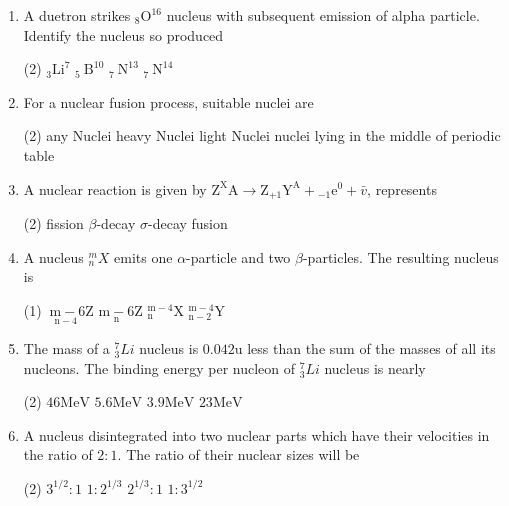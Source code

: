\begin{enumerate}
\begin{tasks}
\task[\textbf{C.}]The attractive part of the nuclear force has a long range
\task[\textbf{D.}]The nuclear force is charge dependent
\end{tasks}
		\item A duetron strikes ${ }_{8} \mathrm{O}^{16}$ nucleus with subsequent emission of alpha particle. Identify the nucleus so produced
	\begin{tasks}(2)
		\task[\textbf{A.}] ${ }_{3} \mathrm{Li}^{7}$
		\task[\textbf{B.}]  ${ }_{5} \mathrm{~B}^{10}$
		\task[\textbf{C.}]${ }_{7} \mathrm{~N}^{13}$
		\task[\textbf{D.}]${ }_{7} \mathrm{~N}^{14}$
	\end{tasks}
		\item For a nuclear fusion process, suitable nuclei are
	\begin{tasks}(2)
		\task[\textbf{A.}]any Nuclei 
		\task[\textbf{B.}] heavy Nuclei
		\task[\textbf{C.}]light Nuclei
		\task[\textbf{D.}]nuclei lying in the middle of periodic table
	\end{tasks}
		\item A nuclear reaction is given by $\mathrm{Z}^{\mathrm{X}}{\mathrm{A}} \rightarrow \mathrm{Z}_{+1} \mathrm{Y}^{\mathrm{A}}+{ }_{-1} \mathrm{e}^{0}+\bar{v}$, represents
	\begin{tasks}(2)
		\task[\textbf{A.}] fission
		\task[\textbf{B.}] $\beta$-decay
		\task[\textbf{C.}]$\sigma$-decay
		\task[\textbf{D.}]fusion
	\end{tasks}
	\item A nucleus ${ }_{n}^{m} X$ emits one $\alpha$-particle and two $\beta$-particles. The resulting nucleus is
\begin{tasks}(1)
	\task[\textbf{A.}] $\underset{\mathrm{n}-4}{\mathrm{~m}-6} \mathrm{Z}$
	\task[\textbf{B.}] $\underset{\mathrm{n}}{\mathrm{m}-6} \mathrm{Z}$
	\task[\textbf{C.}]${ }_{\mathrm{n}}^{\mathrm{m}-4} \mathrm{X}$
	\task[\textbf{D.}]${ }_{\mathrm{n}-2}^{\mathrm{m}-4} \mathrm{Y}$
\end{tasks}
	\item The mass of a ${ }_{3}^{7} L i$ nucleus is $0.042 \mathrm{u}$ less than the sum of the masses of all its nucleons. The binding energy per nucleon of ${ }_{3}^{7} L i$ nucleus is nearly
\begin{tasks}(2)
	\task[\textbf{A.}]$46 \mathrm{MeV}$
	\task[\textbf{B.}] $5.6 \mathrm{MeV}$
	\task[\textbf{C.}]$3.9 \mathrm{MeV}$
	\task[\textbf{D.}]$23 \mathrm{MeV}$ 
\end{tasks}		
	\item A nucleus disintegrated into two nuclear parts which have their velocities in the ratio of $2: 1$. The ratio of their nuclear sizes will be
\begin{tasks}(2)
	\task[\textbf{A.}]  $3^{1 / 2}: 1$
	\task[\textbf{B.}]  $1: 2^{1 / 3}$
	\task[\textbf{C.}]$2^{1 / 3}: 1$
	\task[\textbf{D.}]$1: 3^{1 / 2}$
\end{tasks}	
	
	
	
	
	
\end{enumerate}